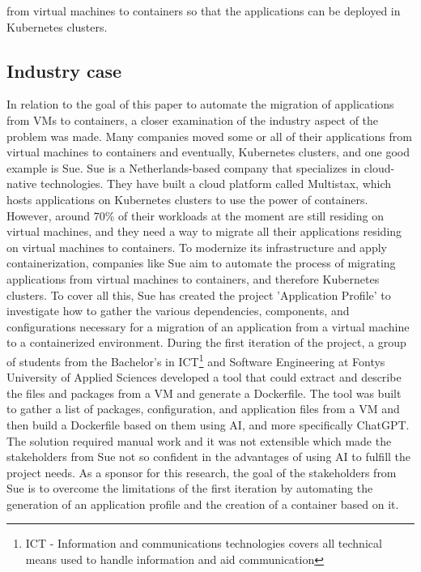 \documentclass[twocolumn]{article}
\begin{document}
from virtual machines to containers so that the applications can be deployed in Kubernetes clusters.

\subsection{Industry case}
In relation to the goal of this paper to automate the migration of applications from VMs to containers, a closer examination of the industry aspect of the problem was made. Many companies moved some or all of their applications from virtual machines to containers and eventually, Kubernetes clusters, and one good example is Sue. Sue is a Netherlands-based company that specializes in cloud-native technologies. They have built a cloud platform called Multistax, which hosts applications on Kubernetes clusters to use the power of containers. However, around 70\% of their workloads at the moment are still residing on virtual machines, and they need a way to migrate all their applications residing on virtual machines to containers. To modernize its infrastructure and apply containerization, companies like Sue aim to automate the process of migrating applications from virtual machines to containers, and therefore Kubernetes clusters. To cover all this, Sue has created the project 'Application Profile' to investigate how to gather the various dependencies, components, and configurations necessary for a migration of an application from a virtual machine to a containerized environment. During the first iteration of the project, a group of students from the Bachelor’s in ICT\footnote{ICT - Information and communications technologies covers all technical means used to handle information and aid communication} and Software Engineering at Fontys University of Applied Sciences developed a tool that could extract and describe the files and packages from a VM and generate a Dockerfile. The tool was built to gather a list of packages, configuration, and application files from a VM and then build a Dockerfile based on them using AI, and more specifically ChatGPT. The solution required manual work and it was not extensible which made the stakeholders from Sue not so confident in the advantages of using AI to fulfill the project needs. As a sponsor for this research, the goal of the stakeholders from Sue is to overcome the limitations of the first iteration by automating the generation of an application profile and the creation of a container based on it.
\end{document}
